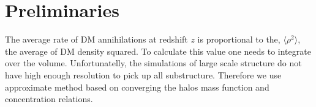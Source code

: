 \section{Preliminaries}
\label{sec:preliminaries}

The average rate of DM annihilations at redshift $z$ is proportional to the, $\langle \rho^2 \rangle$, the average of DM density squared. To calculate this value one needs to integrate over the volume. Unfortunatelly, the simulations of large scale structure do not have high enough resolution to pick up all substructure. Therefore we use approximate method based on converging the halos mass function and concentration relations.